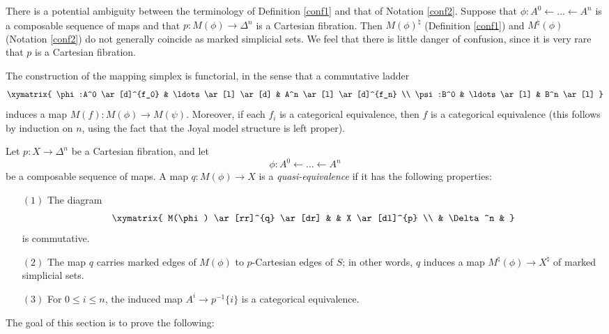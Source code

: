 \begin{remark}
There is a potential ambiguity between the terminology of Definition \ref{conf1} and that of
Notation \ref{conf2}. Suppose that 
$ \phi: A^0 \leftarrow \ldots \leftarrow A^n$ is a composable sequence of maps and that
$p: M(\phi) \rightarrow \Delta^n$ is a Cartesian fibration. Then $M(\phi)^{\natural}$ (Definition \ref{conf1})
and $M^{\natural}(\phi)$ (Notation \ref{conf2}) do not generally coincide as marked simplicial sets. We feel that there is little danger of confusion, since it is very rare that $p$ is a Cartesian fibration.
\end{remark}

\begin{remark}\label{funkytok}
The construction of the mapping simplex is functorial, in the sense that a commutative ladder
$$ \xymatrix{ \phi:A^0 \ar[d]^{f_0} & \ldots \ar[l] \ar[d] & A^n \ar[l] \ar[d]^{f_n} \\
\psi:B^0 & \ldots \ar[l] & B^n \ar[l] }$$
induces a map $M(f): M(\phi) \rightarrow M(\psi)$. Moreover, if each $f_i$ is a categorical equivalence, then $f$ is a categorical equivalence (this follows by induction on $n$, using the fact that the Joyal model structure is left proper).
\end{remark}

\begin{definition}
Let $p: X \rightarrow \Delta^n$ be a Cartesian fibration, and let
$$\phi: A^0 \leftarrow \ldots \leftarrow A^n$$ be a composable sequence of maps.
A map $q: M(\phi) \rightarrow X$ is a {\it quasi-equivalence} if it has the following properties:
\begin{itemize}
\item[$(1)$] The diagram 
$$ \xymatrix{ M(\phi) \ar[rr]^{q} \ar[dr] & & X \ar[dl]^{p} \\
& \Delta^n & }$$ is commutative.

\item[$(2)$] The map $q$ carries marked edges of $M(\phi)$ to $p$-Cartesian edges of $S$; in
other words, $q$ induces a map $M^{\natural}(\phi) \rightarrow X^{\natural}$ of marked simplicial sets.

\item[$(3)$] For $0 \leq i \leq n$, the induced map
$A^i \rightarrow p^{-1} \{i\}$ is a categorical equivalence.
\end{itemize}
\end{definition}

The goal of this section is to prove the following:

